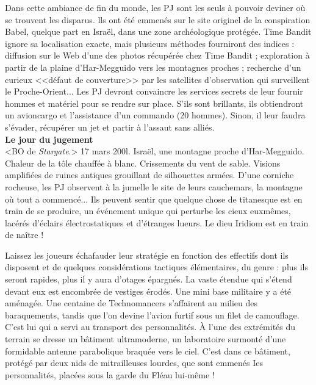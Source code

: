 \documentclass[11pt,twoside,a4paper]{book}
\begin{document}
Dans cette ambiance de fin du monde, les PJ sont les seuls {\`a} pouvoir deviner o{\`u} se trouvent les disparus. lls ont {\'e}t{\'e} emmen{\'e}s sur le site originel de la conspiration Babel, quelque part en Isra{\"e}l, dans une zone arch{\'e}ologique prot{\'e}g{\'e}e. Time Bandit ignore sa localisation exacte, mais plusieurs m{\'e}thodes fourniront des indices : diffusion sur le Web d'une des photos r{\'e}cup{\'e}r{\'e}e chez Time Bandit ; exploration {\`a} partir de la plaine d'Har-Megguido vers les montagnes proches ; recherche d'un curieux <<d{\'e}faut de couverture>> par les satellites d'observation qui surveillent le Proche-Orient... Les PJ devront convaincre les services secrets de leur fournir hommes et mat{\'e}riel pour se rendre sur place. S'ils sont brillants, ils obtiendront un avioncargo et l'assistance d'un commando (20 hommes). Sinon, il leur faudra s'{\'e}vader, r{\'e}cup{\'e}rer un jet et partir {\`a} l'assaut sans alli{\'e}s.~\\

\textbf{\large Le jour du jugement}~\\

<BO de \emph{Stargate}.> 17 mars 200l. Isra{\"e}l, une montagne proche d'Har-Megguido. Chaleur de la t{\^o}le chauff{\'e}e {\`a} blanc. Crissements du vent de sable. Visions amplifi{\'e}es de ruines antiques grouillant de silhouettes arm{\'e}es. D'une corniche rocheuse, les PJ observent {\`a} la jumelle le site de leurs cauchemars, la montagne o{\`u} tout a commenc{\'e}... Ils peuvent sentir que quelque chose de titanesque est en train de se produire, un {\'e}v{\'e}nement unique qui perturbe les cieux euxm{\^e}mes, lac{\'e}r{\'e}s d'{\'e}clairs {\'e}lectrostatiques et d'{\'e}tranges lueurs. Le dieu Iridiom est en train de na{\^i}tre !~\\

\clearpage

Laissez les joueurs {\'e}chafauder leur strat{\'e}gie en fonction des effectifs dont ils disposent et de quelques consid{\'e}rations tactiques {\'e}l{\'e}mentaires, du genre : plus ils seront rapides, plus il y aura d'otages {\'e}pargn{\'e}s. La vaste {\'e}tendue qui s'{\'e}tend devant eux est encombr{\'e}e de vestiges {\'e}rod{\'e}s. Une mini base militaire y a {\'e}t{\'e} am{\'e}nag{\'e}e. Une centaine de Technomancers s'affairent au milieu des baraquements, tandis que l'on devine l'avion furtif sous un filet de camouflage. C'est lui qui a servi au transport des personnalit{\'e}s. {\`A} l'une des extr{\'e}mit{\'e}s du terrain se dresse un b{\^a}timent ultramoderne, un laboratoire surmont{\'e} d'une formidable antenne parabolique braqu{\'e}e vers le ciel. C'est dans ce b{\^a}timent, prot{\'e}g{\'e} par deux nids de mitrailleuses lourdes, que sont emmen{\'e}s Ies personnalit{\'e}s, plac{\'e}es sous la garde du Fl{\'e}au lui-m{\^e}me !~\\
\end{document}
